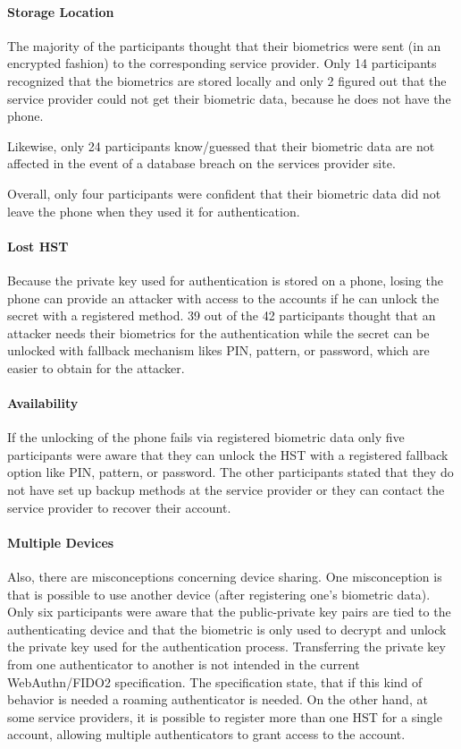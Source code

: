 \documentclass[runningheads]{llncs}
\begin{document}
\paragraph{Storage Location}
The majority of the participants thought that their biometrics were sent (in an encrypted fashion) to the corresponding service provider. Only 14 participants recognized that the biometrics are stored locally and only 2 figured out that the service provider could not get their biometric data, because he does not have the phone.

Likewise, only 24 participants know/guessed that their biometric data are not affected in the event of a database breach on the services provider site.

Overall, only four participants were confident that their biometric data did not leave the phone when they used it for authentication.

\paragraph{Lost HST}
Because the private key used for authentication is stored on a phone, losing the phone can provide an attacker with access to the accounts if he can unlock the secret with a registered method. 39 out of the 42 participants thought that an attacker needs their biometrics for the authentication while the secret can be unlocked with fallback mechanism likes PIN, pattern, or password, which are easier to obtain for the attacker.

\paragraph{Availability}
If the unlocking of the phone fails via registered biometric data only five participants were aware that they can unlock the HST with a registered fallback option like PIN, pattern, or password. The other participants stated that they do not have set up backup methods at the service provider or they can contact the service provider to recover their account.

\paragraph{Multiple Devices}
Also, there are misconceptions concerning device sharing. One misconception is that is possible to use another device (after registering one's biometric data). Only six participants were aware that the public-private key pairs are tied to the authenticating device and that the biometric is only used to decrypt and unlock the private key used for the authentication process. Transferring the private key from one authenticator to another is not intended in the current WebAuthn/FIDO2 specification. The specification state, that if this kind of behavior is needed a roaming authenticator is needed. On the other hand, at some service providers, it is possible to register more than one HST for a single account, allowing multiple authenticators to grant access to the account.
\end{document}
